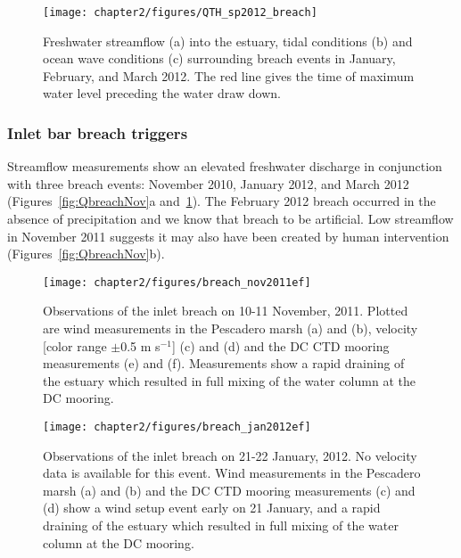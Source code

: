 \begin{figure}[h]
\texttt{[image: chapter2/figures/QTH\_sp2012\_breach]}
\caption{Freshwater streamflow (a) into the estuary, tidal conditions (b) and ocean wave conditions (c) surrounding breach events in January, February, and March 2012. The red line gives the time of maximum water level preceding the water draw down.} \label{fig:QbreachSpring2012}
\end{figure}


\subsubsection{Inlet bar breach triggers}
Streamflow measurements show an elevated freshwater discharge in conjunction with three breach events: November 2010, January 2012, and March 2012 (Figures~\ref{fig:QbreachNov}a and~\ref{fig:QbreachSpring2012}). The February 2012 breach occurred in the absence of precipitation and we know that breach to be artificial. Low streamflow in November 2011 suggests it may also have been created by human intervention (Figures~\ref{fig:QbreachNov}b). 


\begin{figure}[h]
	\texttt{[image: chapter2/figures/breach\_nov2011ef]} \caption{Observations of the inlet breach on 10-11 November, 2011. Plotted are wind measurements in the Pescadero marsh (a) and (b), velocity [color range $\pm$0.5 m s$^{-1}$] (c) and (d) and the DC CTD mooring measurements (e) and (f). Measurements show a rapid draining of the estuary which resulted in full mixing of the water column at the DC mooring.} \label{fig:breach_nov2011}
\end{figure}

\begin{figure}[h]
	\centering
	\texttt{[image: chapter2/figures/breach\_jan2012ef]} 
	\caption{Observations of the inlet breach on 21-22 January, 2012. No velocity data is available for this event. Wind measurements in the Pescadero marsh (a) and (b) and the DC CTD mooring measurements (c) and (d) show a wind setup event early on 21 January, and a rapid draining of the estuary which resulted in full mixing of the water column at the DC mooring.} \label{fig:breach_jan2012}
\end{figure}

